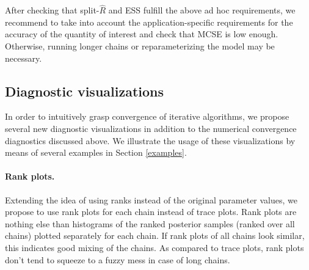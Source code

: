 \documentclass[american,]{article}
\providecommand{\tightlist}{%
  \setlength{\itemsep}{0pt}\setlength{\parskip}{0pt}}
\let\oldparagraph\paragraph
\renewcommand{\paragraph}[1]{\oldparagraph{#1}\mbox{}}
\begin{document}
After checking that split-\(\widehat{R}\) and ESS fulfill the
above ad hoc requirements, we recommend to take into account the
application-specific requirements for the accuracy of the quantity of
interest and check that MCSE is low enough. Otherwise, running longer chains
or reparameterizing the model may be necessary.





\hypertarget{diagnostic-visualizations}{%
\subsection{Diagnostic visualizations}\label{diagnostic-visualizations}}

In order to intuitively grasp convergence of iterative algorithms, we
propose several new diagnostic visualizations in addition to the numerical
convergence diagnostics discussed above. We illustrate the usage of
these visualizations by means of several examples in Section
\ref{examples}.

\hypertarget{rank-plots}{%
\paragraph{Rank plots.}\label{rank-plots}}
Extending the idea of using ranks instead of the original parameter
values, we propose to use rank plots for each chain instead
of trace plots. Rank plots are nothing else than histograms of the
ranked posterior samples (ranked over all chains) plotted separately for
each chain. If rank plots of all chains look similar, this indicates
good mixing of the chains. As compared to trace plots, rank plots don't
tend to squeeze to a fuzzy mess in case of long chains.
\end{document}
